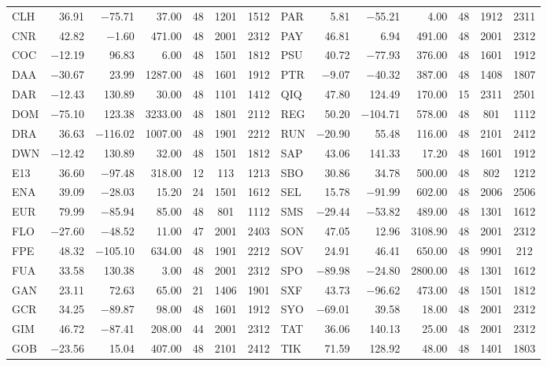 \begin{table}[ht]
\begin{tabular}{lrrrccclrrrccc}
  CLH & 36.91 & $-$75.71 & 37.00 &  48 & 1201 & 1512 & PAR & 5.81 & $-$55.21 & 4.00 &  48 & 1912 & 2311 \\ 
  CNR & 42.82 & $-$1.60 & 471.00 &  48 & 2001 & 2312 & PAY & 46.81 & 6.94 & 491.00 &  48 & 2001 & 2312 \\ 
  COC & $-$12.19 & 96.83 & 6.00 &  48 & 1501 & 1812 & PSU & 40.72 & $-$77.93 & 376.00 &  48 & 1601 & 1912 \\ 
  DAA & $-$30.67 & 23.99 & 1287.00 &  48 & 1601 & 1912 & PTR & $-$9.07 & $-$40.32 & 387.00 &  48 & 1408 & 1807 \\ 
  DAR & $-$12.43 & 130.89 & 30.00 &  48 & 1101 & 1412 & QIQ & 47.80 & 124.49 & 170.00 &  15 & 2311 & 2501 \\ 
  DOM & $-$75.10 & 123.38 & 3233.00 &  48 & 1801 & 2112 & REG & 50.20 & $-$104.71 & 578.00 &  48 & 801 & 1112 \\ 
  DRA & 36.63 & $-$116.02 & 1007.00 &  48 & 1901 & 2212 & RUN & $-$20.90 & 55.48 & 116.00 &  48 & 2101 & 2412 \\ 
  DWN & $-$12.42 & 130.89 & 32.00 &  48 & 1501 & 1812 & SAP & 43.06 & 141.33 & 17.20 &  48 & 1601 & 1912 \\ 
  E13 & 36.60 & $-$97.48 & 318.00 &  12 & 113 & 1213 & SBO & 30.86 & 34.78 & 500.00 &  48 & 802 & 1212 \\ 
  ENA & 39.09 & $-$28.03 & 15.20 &  24 & 1501 & 1612 & SEL & 15.78 & $-$91.99 & 602.00 &  48 & 2006 & 2506 \\ 
  EUR & 79.99 & $-$85.94 & 85.00 &  48 & 801 & 1112 & SMS & $-$29.44 & $-$53.82 & 489.00 &  48 & 1301 & 1612 \\ 
  FLO & $-$27.60 & $-$48.52 & 11.00 &  47 & 2001 & 2403 & SON & 47.05 & 12.96 & 3108.90 &  48 & 2001 & 2312 \\ 
  FPE & 48.32 & $-$105.10 & 634.00 &  48 & 1901 & 2212 & SOV & 24.91 & 46.41 & 650.00 &  48 & 9901 & 212 \\ 
  FUA & 33.58 & 130.38 & 3.00 &  48 & 2001 & 2312 & SPO & $-$89.98 & $-$24.80 & 2800.00 &  48 & 1301 & 1612 \\ 
  GAN & 23.11 & 72.63 & 65.00 &  21 & 1406 & 1901 & SXF & 43.73 & $-$96.62 & 473.00 &  48 & 1501 & 1812 \\ 
  GCR & 34.25 & $-$89.87 & 98.00 &  48 & 1601 & 1912 & SYO & $-$69.01 & 39.58 & 18.00 &  48 & 2001 & 2312 \\ 
  GIM & 46.72 & $-$87.41 & 208.00 &  44 & 2001 & 2312 & TAT & 36.06 & 140.13 & 25.00 &  48 & 2001 & 2312 \\ 
  GOB & $-$23.56 & 15.04 & 407.00 &  48 & 2101 & 2412 & TIK & 71.59 & 128.92 & 48.00 &  48 & 1401 & 1803 \\ 

\end{tabular}
\end{table}
